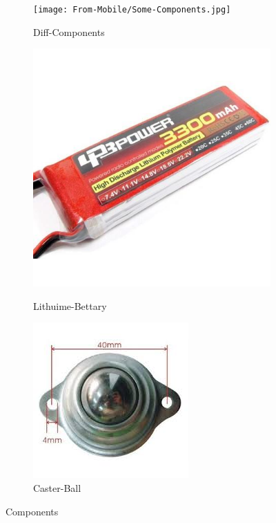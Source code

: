 \documentclass[11pt]{report}
\begin{document}
		\begin{figure}[H]
			\begin{center}
					\begin{subfigure}[normal]{0.4\textwidth}
						\texttt{[image: From-Mobile/Some-Components.jpg]}
						\caption{Diff-Components}
						\label{subfiger:A}
						
						
						\includegraphics[scale=0.1]{Ch2-Planning/Lithuime-Bettary.jpg}
						\caption{Lithuime-Bettary}
						\label{subfiger:B}
						
						\includegraphics[scale=0.2]{Ch2-Planning/Caster-Ball.jpg}
						\caption{Caster-Ball}
						\label{subfiger:c}
						
						
					\end{subfigure}
					\caption{Components}
			\end{center}	
		\end{figure}
		
\end{document}
